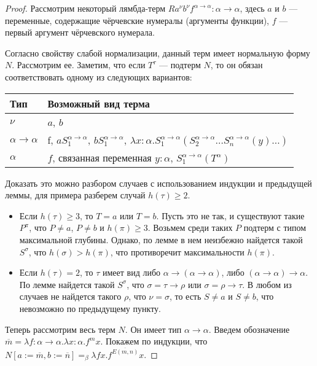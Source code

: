 \begin{proof}
Рассмотрим некоторый лямбда-терм 
$R a^\nu b^\nu f^{\alpha\rightarrow\alpha}: \alpha\rightarrow\alpha$, 
здесь $a$ и $b$ --- переменные, содержащие чёрчевские нумералы (аргументы функции), 
$f$ --- первый аргумент чёрчевского нумерала.

Согласно свойству слабой нормализации, данный терм имеет нормальную форму $N$. 
Рассмотрим ее. Заметим, что если $T^\tau$ --- подтерм $N$, то он обязан соответствовать
одному из следующих вариантов:

\begin{tabular}{ll}
Тип & Возможный вид терма\\
\hline
$\nu$ & $a$, $b$\\
$\alpha\rightarrow\alpha$ & f, $a S_1^{\alpha\rightarrow\alpha}$, $b S_1^{\alpha\rightarrow\alpha}$,
	 $\lambda x:\alpha.S_1^{\alpha\rightarrow\alpha} (S_2^{\alpha\rightarrow\alpha} \dots S_n^{\alpha\rightarrow\alpha} (y) \dots)$\\
$\alpha$ & $f$, связанная переменная $y:\alpha$, $S_1^{\alpha\rightarrow\alpha} (T^\alpha)$
\end{tabular}

Доказать это можно разбором случаев с использованием индукции и предыдущей леммы,
для примера разберем случай $h(\tau) \ge 2$.

\begin{itemize}
\item Если $h(\tau) \ge 3$, то $T=a$ или $T=b$. 
Пусть это не так, и существуют такие $P^\pi$, что $P\ne a$, $P\ne b$ и $h(\pi) \ge 3$.
Возьмем среди таких $P$ подтерм с типом максимальной глубины.
Однако, по лемме в нем неизбежно
найдется такой $S^\sigma$, что $h(\sigma)>h(\pi)$, что противоречит максимальности $h(\pi)$.

\item Если $h(\tau) = 2$, то $\tau$ имеет вид либо $\alpha\rightarrow(\alpha\rightarrow\alpha)$,
либо $(\alpha\rightarrow\alpha)\rightarrow\alpha$. По лемме найдется такой
$S^\sigma$, что $\sigma=\tau\rightarrow\rho$ или $\sigma=\rho\rightarrow\tau$.
В любом из случаев не найдется такого $\rho$, что $\nu = \sigma$, то есть $S\ne a$ и
$S\ne b$, что невозможно по предыдущему пункту.
\end{itemize}

Теперь рассмотрим весь терм $N$. Он имеет тип $\alpha\rightarrow\alpha$. 
Введем обозначение $\overline{m}=\lambda f:\alpha\rightarrow\alpha.\lambda x:\alpha.f^m x$.
Покажем по индукции, что $N[a:=\overline{m}, b :=\overline{n}]=_\beta \lambda fx.f^{\overline{E(m,n)}} x$.


\end{proof}
